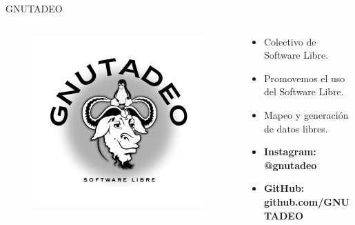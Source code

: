 \documentclass{beamer}
\begin{document}
\begin{frame}{GNUTADEO}

  \begin{columns}
    \begin{column}{.5\textwidth}
      \begin{figure}
        \centering
        \includegraphics[width=\textwidth]{img/gnutadeo.jpg}
      \end{figure}
    \end{column}

    \begin{column}{.5\textwidth}
      \begin{itemize}
      \item Colectivo de Software Libre.
      \item Promovemos el uso del Software Libre.
      \item Mapeo y generación de datos libres.
      \item \textbf{Instagram: @gnutadeo}
      \item \textbf{GitHub: github.com/GNUTADEO}
      \end{itemize}

    \end{column}
  \end{columns}


\end{frame}
\end{document}
